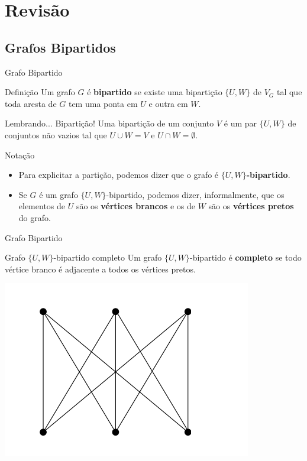 \documentclass[xcolor=dvipsnames,table]{beamer}
\begin{document}
    \section{Revisão}
	\subsection{Grafos Bipartidos}
	\begin{frame}{Grafo Bipartido}
		\begin{block}{Definição}
			Um grafo $G$ é {\bf bipartido} se existe uma bipartição $\{U, W \}$ de $V_G$ tal que toda aresta de $G$ tem uma ponta em $U$ e outra em $W$.
		\end{block}
		\begin{block}{Lembrando... Bipartição!}
			Uma bipartição de um conjunto $V$ é um par $\{U, W\}$ de conjuntos não vazios tal que $U \cup W = V$ e $U \cap W = \emptyset$.
		\end{block}
		\begin{block}{Notação}
			\begin{itemize}
				\item Para explicitar a partição, podemos dizer que o grafo é {\bf $\{ U, W \}$-bipartido}. 
				\item Se $G$ é um grafo $\{ U, W \}$-bipartido, podemos dizer, informalmente, que os elementos de $U$ são os {\bf vértices brancos} e os de $W$ são os {\bf vértices pretos} do grafo.
			\end{itemize}
		\end{block} 
	\end{frame}
	
	\begin{frame}{Grafo Bipartido}
		\begin{block}{Grafo $\{ U, W \}$-bipartido completo}
			Um grafo $\{U, W \}$-bipartido é {\bf completo} se todo vértice branco é adjacente a todos os vértices pretos. 
		\end{block}
		\begin{center}
			\includegraphics[width=.6\textwidth]{images/bipartido-completo.png}
		\end{center}
	\end{frame}
	
\end{document}

